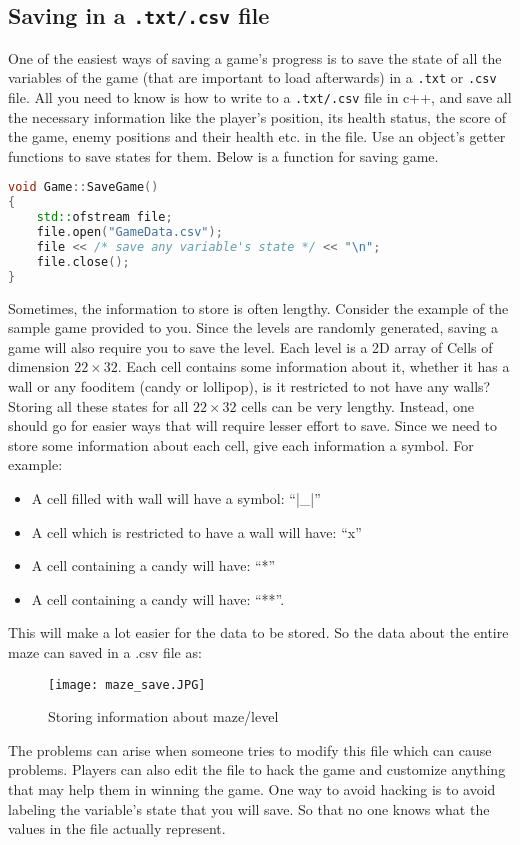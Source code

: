 \documentclass[11pt,fleqn]{book} %
\begin{document}
    \subsection{Saving in a \texttt{.txt/.csv} file}
    One of the easiest ways of saving a game's progress is to save the state of all the variables of the game (that are important to load afterwards) in a \texttt{.txt} or \texttt{.csv} file. All you need to know is how to write to a \texttt{.txt/.csv} file in c++, and save all the necessary information like the player's position, its health status, the score of the game, enemy positions and their health etc. in the file. Use an object's getter functions to save states for them. Below is a function for saving game. \\
\begin{lstlisting}[language=C++, caption=Saving a game]
void Game::SaveGame()
{
    std::ofstream file;
    file.open("GameData.csv");
    file << /* save any variable's state */ << "\n";
    file.close();
}
\end{lstlisting}
Sometimes, the information to store is often lengthy. Consider the example of the sample game provided to you. Since the levels are randomly generated, saving a game will also require you to save the level. Each level is a 2D array of Cells of dimension \(22 \times 32\). Each cell contains some information about it, whether it has a wall or any fooditem (candy or lollipop), is it restricted to not have any walls? Storing all these states for all \(22 \times 32\) cells can be very lengthy. Instead, one should go for easier ways that will require lesser effort to save. Since we need to store some information about each cell, give each information a symbol. For example: \\
\begin{itemize}
\item A cell filled with wall will have a symbol: “|\_|”
\item A cell which is restricted to have a wall will have: “x”
\item A cell containing a candy will have: “*”
\item A cell containing a candy will have: “**”.
\end{itemize} 
This will make a lot easier for the data to be stored. So the data about the entire maze can saved in a .csv file as:
\begin{figure}[ht]
            \centering
            \texttt{[image: maze\_save.JPG]}
            \caption{Storing information about maze/level}
            \label{fig:my_label}
\end{figure} 
The problems can arise when someone tries to modify this file which can cause problems. Players can also edit the file to hack the game and customize anything that may help them in winning the game. One way to avoid hacking is to avoid labeling the variable's state that you will save. So that no one knows what the values in the file actually represent. 
\end{document}
